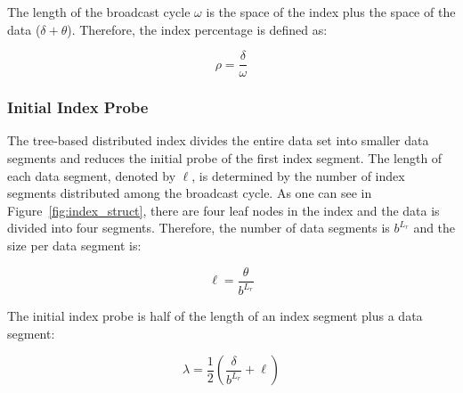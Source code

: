 The length of the broadcast cycle $\omega$ is the space of the
index plus the space of the data ($\delta+\theta$). Therefore, the
index percentage is defined as:

\begin{equation}
\rho = \frac{\delta}{\omega}
\end{equation}

\subsubsection{Initial Index Probe}

The tree-based distributed index divides the entire data set into
smaller data segments and reduces the initial probe of the first
index segment. The length of each data segment, denoted by $\ell$,
is determined by the number of index segments distributed among
the broadcast cycle. As one can see in
Figure~\ref{fig:index_struct}, there are four leaf nodes in the
index and the data is divided into four segments. Therefore, the
number of data segments is $b^{L_r}$ and the size per data segment
is:

\begin{equation}
\ell = \frac{\theta}{b^{L_r}}
\end{equation}

The initial index probe is half of the length of an index segment
plus a data segment:

\begin{equation}
\lambda = \frac{1}{2}(\frac{\delta}{b^{L_r}}+\ell)
\end{equation}



%

